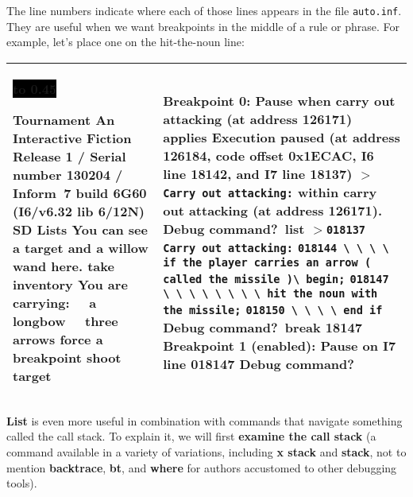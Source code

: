 \documentclass{book}
\newcommand{\n}{\hspace*{\fill}\newline}
\newcommand{\terp}[2]{\begin{center}\begin{tabular}{p{0.45\textwidth}|p{0.45\textwidth}}\midrule #1&#2\\\midrule\end{tabular}\end{center}}
\newcommand{\glkheading}[1]{\textbf{#1}}
\newcommand{\glkinput}[1]{\textbf{#1}}
\newcommand{\glkstatusline}[2]{\centerline{\colorbox{black}{\hbox to 0.45\textwidth{\textcolor{white}{#1\hfil #2}}}}}
\newcommand{\storyprompt}{\raisebox{1.5pt}{\(>\)}}
\newcommand{\cursor}{\raisebox{-1.5pt}{\RectangleThin}}
\newcommand{\markedindent}{\(>\)\qquad}
\newcommand{\unmarkedindent}{\hphantom{\(>\)}\qquad}
\begin{document}
The line numbers indicate where each of those lines appears in the file
\texttt{auto.inf}.  They are useful when we want breakpoints in the middle of a
rule or phrase.  For example, let's place one on the hit-the-noun line:

\terp{\glkstatusline{Lists}{0/2}\n
  \glkheading{Tournament}\n
  An Interactive Fiction\n
  Release 1 / Serial number 130204 / Inform~7 build 6G60 (I6/v6.32 lib 6/12N) SD\n
  \n
  \glkheading{Lists}\n
  You can see a target and a willow wand here.\n
  \n
  \storyprompt\glkinput{take inventory}\n
  You are carrying:\n
  \null\ \ a longbow\n
  \null\ \ three arrows\n
  \n
  \storyprompt\glkinput{force a breakpoint}\n
  \storyprompt\glkinput{shoot target}}{%
  \glkheading{Breakpoint 0:} Pause when carry out attacking (at address 126171) applies\n
  \n
  Execution paused (at address 126184, code offset 0x1ECAC, I6 line 18142, and I7 line 18137)\n
  \markedindent \lstinline{Carry out attacking:}\n
  within carry out attacking (at address 126171).\n
  \n
  Debug command?\ \glkinput{list}\n
  \n
  \markedindent \lstinline{018137 Carry out attacking:}\n
  \unmarkedindent \lstinline{018144 \ \ \ \ if the player carries an arrow ( called the missile )}\lstinline{\ begin;}\n
  \unmarkedindent \lstinline{018147 \ \ \ \ \ \ \ \ hit the noun with the missile;}\n
  \unmarkedindent \lstinline{018150 \ \ \ \ end if}\n
  \n
  Debug command?\ \glkinput{break 18147}\n
  \n
  Breakpoint 1 (enabled): Pause on I7 line 018147\n
  \n
  Debug command?\ \cursor}

\glkinput{List} is even more useful in combination with commands that navigate
something called the call stack.  To explain it, we will first \glkinput{examine
  the call stack} (a command available in a variety of variations, including
\glkinput{x stack} and \glkinput{stack}, not to mention \glkinput{backtrace},
\glkinput{bt}, and \glkinput{where} for authors accustomed to other debugging
tools).
\end{document}
